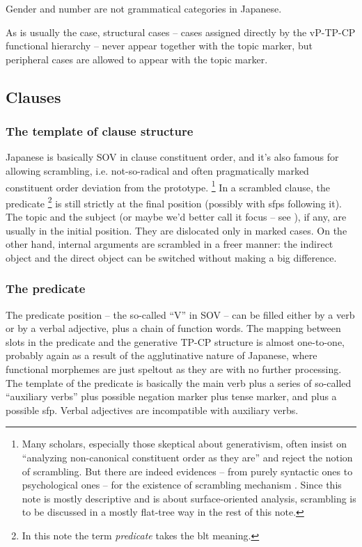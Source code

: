\documentclass[UTF8, a4paper, oneside, scheme=plain]{ctexart}
\newcommand*{\term}[1]{\emph{#1}}
\begin{document}
Gender and number are not grammatical categories in Japanese.



As is usually the case,
structural cases -- cases assigned directly by the vP-TP-CP functional hierarchy 
-- never appear together with the topic marker,
but peripheral cases are allowed to appear with the topic marker.

\subsection{Clauses}

\subsubsection{The template of clause structure}

Japanese is basically SOV in clause constituent order,
and it's also famous for allowing scrambling,
i.e. not-so-radical and often pragmatically marked constituent order deviation from the prototype.%
\footnote{
    Many scholars, especially those skeptical about generativism,
    often insist on ``analyzing non-canonical constituent order as they are''
    and reject the notion of scrambling.
    But there are indeed evidences -- from purely syntactic ones to psychological ones -- 
    for the existence of scrambling mechanism \citep{imamura2015effects,imamura2016processing,yatsushiro2003vp}.
    Since this note is mostly descriptive and is about surface-oriented analysis,
    scrambling is to be discussed in a mostly flat-tree way in the rest of this note.
}
In a scrambled clause, 
the predicate%
\footnote{
    In this note the term \term{predicate} takes the \ac{blt} meaning.
}
is still strictly at the final position 
(possibly with \acs{sfp}s following it).
The topic and the subject (or maybe we'd better call it focus -- see ), 
if any, are usually in the initial position.
They are dislocated only in marked cases.
On the other hand, 
internal arguments are scrambled in a freer manner:
the indirect object and the direct object can be switched without making a big difference.

\subsubsection{The predicate}\label{sec:predicate-abs}

The predicate position -- the so-called ``V'' in SOV -- 
can be filled either by a verb or by a verbal adjective,
plus a chain of function words.
The mapping between slots in the predicate and the generative TP-CP structure is almost one-to-one,
probably again as a result of the agglutinative nature of Japanese,
where functional morphemes are just speltout as they are with no further processing.
The template of the predicate is basically
the main verb plus a series of so-called ``auxiliary verbs'' 
plus possible negation marker plus tense marker,
and plus a possible \ac{sfp}. 
Verbal adjectives are incompatible with auxiliary verbs.
\end{document}
